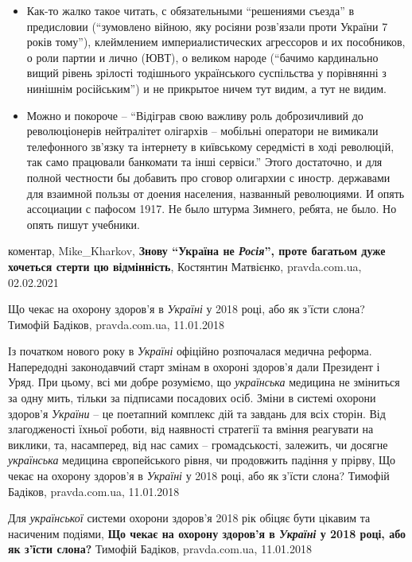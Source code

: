 \begin{itemize}
\item Как-то жалко такое читать, с обязательными \enquote{решениями съезда} в
        предисловии (\enquote{зумовлено війною, яку росіяни розв'язали проти України 7
        років тому}), клеймлением империалистических агрессоров и их
        пособников, о роли партии и лично (ЮВТ), о великом народе (\enquote{бачимо
        кардинально вищий рівень зрілості тодішнього українського суспільства у
        порівнянні з нинішнім російським}) и не прикрытое ничем тут видим, а
        тут не видим.
\item Можно и покороче – \enquote{Відіграв свою важливу роль доброзичливий до
        революціонерів нейтралітет олігархів – мобільні оператори не вимикали
        телефонного зв'язку та інтернету в київському середмісті в ході
        революцій, так само працювали банкомати та інші сервіси.} Этого
        достаточно, и для полной честности бы добавить про сговор олигархии с
        иностр. державами для взаимной пользы от доения населения, названный
        революциями. И опять ассоциации с пафосом 1917. Не было штурма Зимнего,
        ребята, не было. Но опять пишут учебники.
\end{itemize}
коментар, Mike\_Kharkov, \textbf{Знову \enquote{Україна не \emph{Росія}}, проте багатьом дуже хочеться стерти цю відмінність},
Костянтин Матвієнко, pravda.com.ua, 02.02.2021

Що чекає на охорону здоров'я в \emph{Україні} у 2018 році, або як з'їсти слона? 
Тимофій Бадіков, pravda.com.ua, 11.01.2018

Із початком нового року в \emph{Україні} офіційно розпочалася медична реформа.
Напередодні законодавчий старт змінам в охороні здоров'я дали Президент і Уряд.
При цьому, всі ми добре розуміємо, що \emph{українська} медицина не зміниться за одну
мить, тільки за підписами посадових осіб. Зміни в системі охорони здоров'я
\emph{України} – це поетапний комплекс дій та завдань для всіх сторін. Від
злагодженості їхньої роботи, від наявності стратегії та вміння реагувати на
виклики, та, насамперед, від нас самих – громадськості, залежить, чи досягне
\emph{українська} медицина європейського рівня, чи продовжить падіння у прірву,
Що чекає на охорону здоров'я в \emph{Україні} у 2018 році, або як з'їсти слона? 
Тимофій Бадіков, pravda.com.ua, 11.01.2018

Для \emph{української} системи охорони здоров'я 2018 рік обіцяє бути цікавим та насиченим подіями,
\textbf{Що чекає на охорону здоров'я в \emph{Україні} у 2018 році, або як з'їсти слона?} 
Тимофій Бадіков, pravda.com.ua, 11.01.2018

